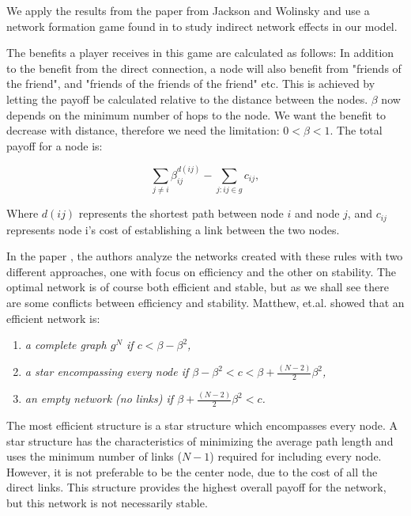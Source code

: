 We apply the results from the paper from Jackson and Wolinsky \cite{jackson1996strategic} and use a network formation game found in \cite{jackson2005survey} to study indirect network effects in our model. 

The benefits a player receives in this game are calculated as follows: In addition to the benefit from the direct connection, a node will also benefit from "friends of the friend", and "friends of the friends of the friend" etc. This is achieved by letting the payoff be calculated relative to the distance between the nodes. $\beta$ now depends on the minimum number of hops to the node. We want the benefit to decrease with distance, therefore we need the limitation: $0<\beta<1$. 
The total payoff for a node is:

\begin{equation}
\sum_{j\neq i}^{} \beta_{ij}^{d(ij)} - \sum_{j:ij\in g}^{} {c}_{ij}, 
\label{eq:connecetionGame}
\end{equation}

Where $d(ij)$ represents the shortest path between node $i $ and node $j $, and ${c}_{ij}$ represents node i's cost of establishing a link between the two nodes. 

In the paper \cite{jackson1996strategic}, the authors analyze the networks created with these rules with two different approaches, one with focus on efficiency and the other on stability.  The optimal network is of course both efficient and stable, but as we shall see there are some conflicts between efficiency and stability. Matthew, et.al. showed that an efficient network is:
\begin{enumerate}
\item \textit{a complete graph $g^N$ if $c<\beta - \beta^2$,}
\item \textit{a star encompassing every node if $\beta - \beta^2 < c < \beta + \frac{(N-2)}{2}\beta^2$,}
\item \textit{an empty network (no links) if $\beta + \frac{(N-2)}{2}\beta^2 < c$.}
\end{enumerate}

The most efficient structure is a star structure which encompasses every node. A star structure has the characteristics of minimizing the average path length and uses the minimum number of links ($N-1$) required for including every node. However, it is not preferable to be the center node, due to the cost of all the direct links. 
This structure provides the highest overall payoff for the network, but this network is not necessarily stable.

